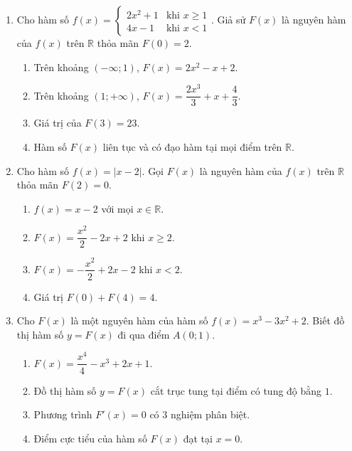 \documentclass[12pt]{article}
\begin{document}
\begin{enumerate}[label=\textbf{Câu \arabic*.}, start=1]
		\item Cho hàm số $f(x) = \begin{cases} 2x^2 + 1 & \text{khi } x \ge 1 \\ 4x - 1 & \text{khi } x < 1 \end{cases}$. Giả sử $F(x)$ là nguyên hàm của $f(x)$ trên $\mathbb{R}$ thỏa mãn $F(0) = 2$.
		\begin{enumerate}[label=\alph*)]
			\item Trên khoảng $(-\infty; 1)$, $F(x) = 2x^2 - x + 2$.
			\item Trên khoảng $(1; +\infty)$, $F(x) = \dfrac{2x^3}{3} + x + \dfrac{4}{3}$.
			\item Giá trị của $F(3) = 23$.
			\item Hàm số $F(x)$ liên tục và có đạo hàm tại mọi điểm trên $\mathbb{R}$.
		\end{enumerate}
		
		\item Cho hàm số $f(x) = |x - 2|$. Gọi $F(x)$ là nguyên hàm của $f(x)$ trên $\mathbb{R}$ thỏa mãn $F(2) = 0$.
		\begin{enumerate}[label=\alph*)]
			\item $f(x) = x - 2$ với mọi $x \in \mathbb{R}$.
			\item $F(x) = \dfrac{x^2}{2} - 2x + 2$ khi $x \ge 2$.
			\item $F(x) = -\dfrac{x^2}{2} + 2x - 2$ khi $x < 2$.
			\item Giá trị $F(0) + F(4) = 4$.
		\end{enumerate}
		
		\item Cho $F(x)$ là một nguyên hàm của hàm số $f(x) = x^3 - 3x^2 + 2$. Biết đồ thị hàm số $y = F(x)$ đi qua điểm $A(0; 1)$.
		\begin{enumerate}[label=\alph*)]
			\item $F(x) = \dfrac{x^4}{4} - x^3 + 2x + 1$.
			\item Đồ thị hàm số $y = F(x)$ cắt trục tung tại điểm có tung độ bằng $1$.
			\item Phương trình $F'(x) = 0$ có $3$ nghiệm phân biệt.
			\item Điểm cực tiểu của hàm số $F(x)$ đạt tại $x = 0$.
		\end{enumerate}
		

\end{enumerate}
\end{document}
